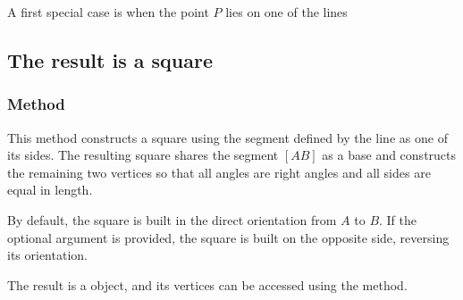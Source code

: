\vspace{1em}
A first special case is when the point $P$ lies on one of the lines

\vspace{1em}

\begin{tkzexample}[latex=.5\textwidth]
\begin{center}
\end{center}
\end{tkzexample}


\subsection{The result is a square} %

\subsubsection{Method } %
\label{ssub:method_line_square}

This method constructs a square using the segment defined by the line as one of its sides. The resulting square shares the segment $[AB]$ as a base and constructs the remaining two vertices so that all angles are right angles and all sides are equal in length.

\medskip
\noindent
By default, the square is built in the direct orientation from $A$ to $B$. If the optional argument  is provided, the square is built on the opposite side, reversing its orientation.

\medskip
\noindent
The result is a  object, and its vertices can be accessed using the  method.

\vspace{1em}

\begin{tkzexample}[latex=.5\textwidth]
      
\end{tkzexample}

